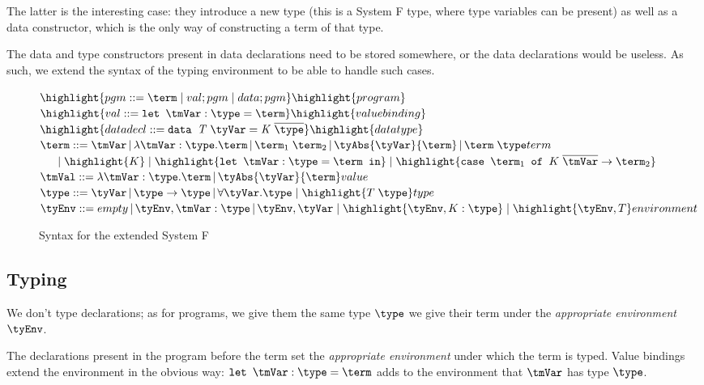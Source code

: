 The latter is the interesting case: they introduce a new type (this is a System F type, where type variables can be present) as well as a data constructor, which is the only way of constructing a term of that type.

The data and type constructors present in data declarations need to be stored somewhere, or the data declarations would be useless. As such, we extend the syntax of the typing environment to be able to handle such cases.

\begin{figure}
  $\highlight{pgm::= \term\; |\; val;pgm\; |\;data;pgm}\hfill \highlight{program}$\\
  $\highlight{val::=\mathit{\texttt{let }} \tmVar : \type = \term}\hfill \highlight{value binding}$\\
  $\highlight{datadecl::=\mathit{\texttt{data } T\; \tyVar = K \;\overline{\type}} }\hfill \highlight{datatype}$\\
  $\term ::= \tmVar\,|\,\lambda \tmVar:\type.\term\,|\,\term_1 \; \term_2 \,|\,\tyAbs{\tyVar}{\term}\,|\,\term\;\type \hfill term $\\
 $\phantom{aaa}|\;\highlight{K} \;|\;\highlight{\mathit{\texttt{let }} \tmVar : \type = \term \mathit{\texttt{ in}}} \;|\;\highlight{ \mathit{\texttt{case }} \term_1 \mathit{\texttt{ of }} K \; \overline{\tmVar} \rightarrow \term_2} $\\
  $\tmVal::= \lambda \tmVar:\type.\term \,|\,\tyAbs{\tyVar}{\term}\hfill value$\\
  $\type ::= \tyVar\,|\,\type \rightarrow \type \,|\,\forall \tyVar.\type\;|\; \highlight{T\;\type} \hfill type$\\
  $\tyEnv::=  empty \,|\, \tyEnv, \tmVar:\type\,|\, \tyEnv,\tyVar\;|\; \highlight{\tyEnv,K:\type}\;|\;\highlight{\tyEnv,T} \hfill environment$\\
  \caption{Syntax for the extended System F}
  \label{exsysfsyntax}
\end{figure}
\subsection{Typing}
We don't type declarations; as for programs, we give them the same type $\type$ we give their term  under the \textit{appropriate environment} $\tyEnv$.

The declarations present in the program before the term set the \textit{appropriate environment} under which the term is typed. Value bindings extend the environment in the obvious way: $\mathit{\texttt{let }} \tmVar : \type = \term$ adds to the environment that $\tmVar$ has type $\type$.

